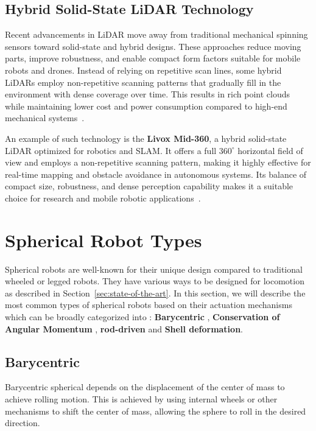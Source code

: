 \documentclass[english, bachelor, utf8]{base/thesis_telematics}
\begin{document}
\subsection{Hybrid Solid-State LiDAR Technology}
Recent advancements in LiDAR move away from traditional mechanical spinning sensors toward solid-state and hybrid designs. 
These approaches reduce moving parts, improve robustness, and enable compact form factors suitable for mobile robots and drones. 
Instead of relying on repetitive scan lines, some hybrid LiDARs employ non-repetitive scanning patterns that gradually fill in the environment with dense coverage over time. 
This results in rich point clouds while maintaining lower cost and power consumption compared to high-end mechanical systems~\cite{globalgps_lidar_types,govcomm_compared}.  

An example of such technology is the \textbf{Livox Mid-360}, a hybrid solid-state LiDAR optimized for robotics and SLAM. 
It offers a full \(360^\circ\) horizontal field of view and employs a non-repetitive scanning pattern, making it highly effective for real-time mapping and obstacle avoidance in autonomous systems. Its balance of compact size, robustness, and dense perception capability makes it a suitable choice for research and mobile robotic applications~\cite{livox_mid360_docs}.

\section{Spherical Robot Types}
\label{sec:spherical-robot-types}
Spherical robots are well-known for their unique design compared to traditional wheeled or legged robots.
They have various ways to be designed for locomotion as described in Section~\ref{sec:state-of-the-art}.
In this section, we will describe the most common types of spherical robots based on their actuation mechanisms which can be broadly categorized into : \textbf{Barycentric} , \textbf{Conservation of Angular Momentum} , \textbf{rod-driven} and \textbf{Shell deformation}.
\subsection{Barycentric}
Barycentric spherical depends on the displacement of the center of mass to achieve rolling motion.
This is achieved by using internal wheels or other mechanisms to shift the center of mass, allowing the sphere to roll in the desired direction.~\cite{Aminata}
\end{document}
